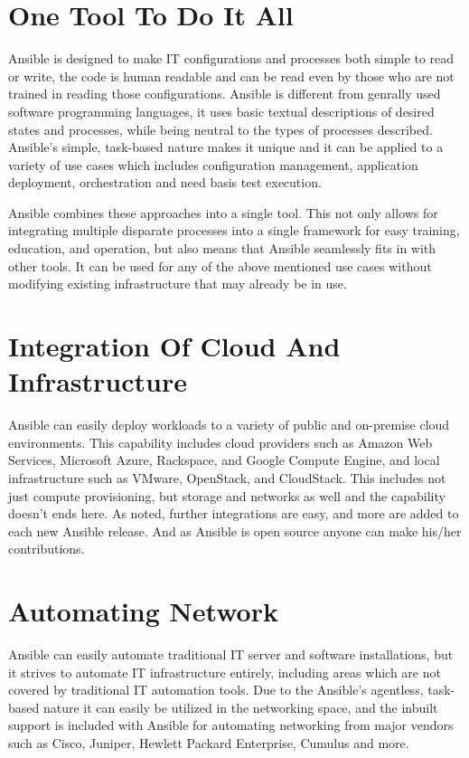 \documentclass[9pt,twocolumn,twoside]{styles/osajnl}
\begin{document}
\section{One Tool To Do It All}

Ansible is designed to make IT configurations and processes both
simple to read or write, the code is human readable and can be read
even by those who are not trained in reading those
configurations. Ansible is different from genrally used software
programming languages, it uses basic textual descriptions of desired
states and processes, while being neutral to the types of processes
described. Ansible’s simple, task-based nature makes it unique and it
can be applied to a variety of use cases which includes configuration
management, application deployment, orchestration and need basis test
execution.

Ansible combines these approaches into a single tool. This not only
allows for integrating multiple disparate processes into a single
framework for easy training, education, and operation, but also means
that Ansible seamlessly fits in with other tools. It can be used for
any of the above mentioned use cases without modifying existing
infrastructure that may already be in use.

\section{Integration Of Cloud And Infrastructure}

Ansible can easily deploy workloads to a variety of public and
on-premise cloud environments. This capability includes cloud
providers such as Amazon Web Services, Microsoft Azure, Rackspace, and
Google Compute Engine, and local infrastructure such as VMware,
OpenStack, and CloudStack. This includes not just compute
provisioning, but storage and networks as well and the capability
doesn't ends here. As noted, further integrations are easy, and more
are added to each new Ansible release. And as Ansible is open source
anyone can make his/her contributions.\cite{www-ansible}

\section{Automating Network}

Ansible can easily automate traditional IT server and software
installations, but it strives to automate IT infrastructure entirely,
including areas which are not covered by traditional IT automation
tools. Due to the Ansible’s agentless, task-based nature it can easily
be utilized in the networking space, and the inbuilt support is
included with Ansible for automating networking from major vendors
such as Cisco, Juniper, Hewlett Packard Enterprise, Cumulus and
more.\cite{www-ansible3}
\end{document}
